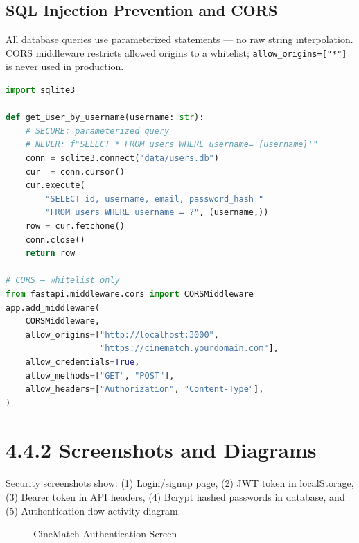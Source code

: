 \documentclass[12pt,a4paper]{report}
\begin{document}
\subsection{SQL Injection Prevention and CORS}

All database queries use parameterized statements — no raw string interpolation. CORS middleware restricts allowed origins to a whitelist; \texttt{allow\_origins=["*"]} is never used in production.

\begin{lstlisting}[language=Python, caption={SQL Injection Prevention and CORS Configuration}]
import sqlite3

def get_user_by_username(username: str):
    # SECURE: parameterized query
    # NEVER: f"SELECT * FROM users WHERE username='{username}'"
    conn = sqlite3.connect("data/users.db")
    cur  = conn.cursor()
    cur.execute(
        "SELECT id, username, email, password_hash "
        "FROM users WHERE username = ?", (username,))
    row = cur.fetchone()
    conn.close()
    return row

# CORS — whitelist only
from fastapi.middleware.cors import CORSMiddleware
app.add_middleware(
    CORSMiddleware,
    allow_origins=["http://localhost:3000",
                   "https://cinematch.yourdomain.com"],
    allow_credentials=True,
    allow_methods=["GET", "POST"],
    allow_headers=["Authorization", "Content-Type"],
)
\end{lstlisting}

\section{4.4.2 Screenshots and Diagrams}

Security screenshots show: (1) Login/signup page, (2) JWT token in localStorage, (3) Bearer token in API headers, (4) Bcrypt hashed passwords in database, and (5) Authentication flow activity diagram.

\begin{figure}[H]
\centering
{}
\caption{CineMatch Authentication Screen}
\label{fig:auth_screen}
\end{figure}
\end{document}
